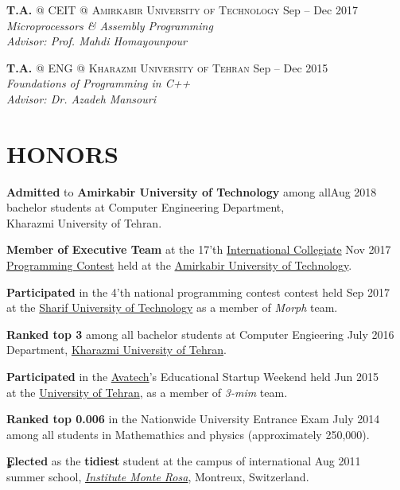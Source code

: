 \documentclass[margin, 10pt]{res} %
\begin{document}
\begin{resume}
   \textbf{T.A.} \textsc{@}
   \textsc{CEIT} \textsc{@} \textsc{Amirkabir University of Technology}
   \hfill {Sep -- Dec 2017}\\
   \textit{Microprocessors \& Assembly Programming}\\
   \textit{Advisor: Prof. Mahdi Homayounpour}
   \href{https://github.com/aligholamee/Microprocessors}{\hfill\UrlFont[Resources]}
   
   \textbf{T.A.} \textsc{@}
   \textsc{ENG} \textsc{@} \textsc{Kharazmi University of Tehran}
   \hfill {Sep -- Dec 2015}\\
   \textit{Foundations of Programming in C++}\\
   \textit{Advisor: Dr. Azadeh Mansouri}
   \href{https://github.com/aligholamee/Foundations-of-Programming}{\hfill\UrlFont[Resources]}

	\section{HONORS}
	\textbf{Admitted} to 
	\textbf{Amirkabir University of Technology}
	among all\hfill {Aug 2018}\\ bachelor students at Computer Engineering 
	Department,\\ Kharazmi University of Tehran.
	
	\textbf{Member of Executive Team}
	at the 17'th \href{https://icpc.baylor.edu/regionals/finder/tehran-2017}{International Collegiate} \hfill {Nov 2017}\\  \href{https://icpc.baylor.edu/regionals/finder/tehran-2017}{Programming Contest} held at the \href{http://ceit.aut.ac.ir}{Amirkabir University of Technology}.
	
	\textbf{Participated}
	in the 4'th national programming contest contest held \hfill {Sep 2017}\\at the \href{http://sharif.ir}{Sharif University of Technology} as a member of \textit{Morph} team.

	\textbf{Ranked top 3}
	among all bachelor students at Computer Engieering \hfill {July 2016}\\ Department, \href{http://khu.ac.ir}{Kharazmi University of Tehran}.
	
	\textbf{Participated}
	in the \href{http://avatech.ir}{Avatech}'s Educational Startup Weekend held \hfill {Jun 2015}\\at the \href{http://ut.ac.ir}{University of Tehran}, as a member of \textit{3-mim} team.
	
	\textbf{Ranked top 0.006}
	in the Nationwide University Entrance Exam \hfill {July 2014}\\ among all students in 
	Mathemathics and physics (approximately 250,000).
	
	\textbf{ٍElected}
	as the \textbf{tidiest} student at the campus of international \hfill {Aug 2011}\\ summer school, \textit{\href{https://www.monterosa.ch/}{Institute Monte Rosa}}, Montreux, Switzerland. 
    \end{resume}
\end{document}
